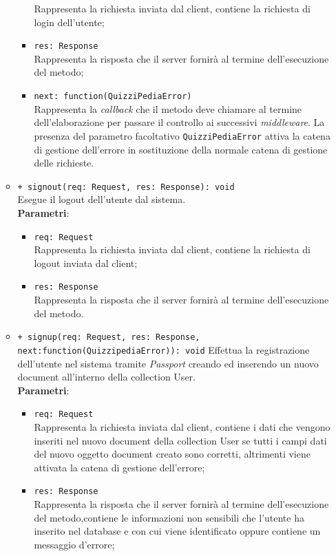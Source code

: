 \begin{itemize}
\begin{itemize}
\begin{itemize}
			Rappresenta la richiesta inviata dal client, contiene la richiesta di login dell’utente;
		  \item
			\texttt{res: Response} \\
			Rappresenta la risposta che il server fornirà al termine dell'esecuzione del metodo;
		  \item
		    \texttt{next: function(QuizziPediaError)} \\
			Rappresenta la \textit{callback} che il metodo deve chiamare al termine dell'elaborazione per passare il controllo ai successivi \textit{middleware}. La presenza del parametro facoltativo \texttt{QuizziPediaError} attiva la catena di gestione dell'errore in sostituzione della normale catena di gestione delle richieste.
		 \end{itemize}
		\item
		\texttt{+ signout(req: Request, res: Response): void} \\
		Esegue il logout dell’utente dal sistema.\\
		\textbf{Parametri}:
		 \begin{itemize}
		 \item
			\texttt{req: Request} \\
			Rappresenta la richiesta inviata dal client, contiene la richiesta di logout inviata dal client;
		 \item
			\texttt{res: Response} \\
			Rappresenta la risposta che il server fornirà al termine dell'esecuzione del metodo. 
		 \end{itemize} 
		\item
		\texttt{+ signup(req: Request, res: Response, \\next:function(QuizzipediaError)): void}
		Effettua la registrazione dell’utente nel sistema tramite \textit{Passport} creando ed inserendo un nuovo document all’interno della collection User.\\
		\textbf{Parametri}:
		 \begin{itemize}
		 \item
			\texttt{req: Request} \\
			Rappresenta la richiesta inviata dal client, contiene i dati che vengono inseriti nel nuovo document della collection User se tutti i campi dati del nuovo oggetto document creato sono corretti, altrimenti viene attivata la catena di gestione dell'errore;
		 \item
			\texttt{res: Response} \\
			Rappresenta la risposta che il server fornirà al termine dell'esecuzione del metodo,contiene le informazioni non sensibili che l'utente ha inserito nel database e con cui viene identificato oppure contiene un messaggio d'errore;

\end{itemize}
\end{itemize}
\end{itemize}
